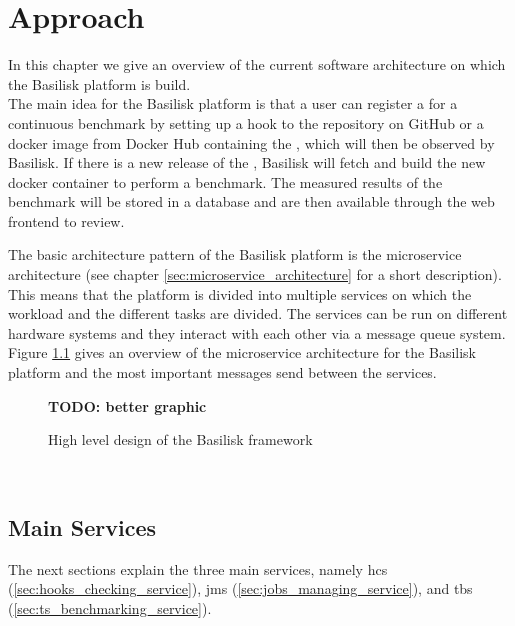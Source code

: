 \chapter{Approach}
\label{ch:approach}

In this chapter we give an overview of the current software architecture on which the Basilisk platform is build.
\\

The main idea for the Basilisk platform is that a user can register a \ts{} for a continuous benchmark by setting up a hook to the repository on GitHub or a docker image from Docker Hub containing the \ts{}, which will then be observed by Basilisk.
If there is a new release of the \ts{}, Basilisk will fetch and build the new docker container to perform a benchmark.
The measured results of the benchmark will be stored in a database and are then available through the web frontend to review.


The basic architecture pattern of the Basilisk platform is the microservice architecture (see chapter \ref{sec:microservice_architecture} for a short description). 
This means that the platform is divided into multiple services on which the workload and the different tasks are divided.
The services can be run on different hardware systems and they interact with each other via a message queue system.
\\

Figure \ref{fig:basilisk_high_level_design} gives an overview of the microservice architecture for the Basilisk platform and the most important messages send between the services.
\begin{figure}[tbph]
	\centering
	\textbf{TODO: better graphic}
	\caption{High level design of the Basilisk framework}
	\label{fig:basilisk_high_level_design}
\end{figure}
\\

\section{Main Services}
\label{sec:main_services}
The next sections explain the three main services, namely \acl{hcs} (\ref{sec:hooks_checking_service}), \acl{jms} (\ref{sec:jobs_managing_service}), and \acl{tbs} (\ref{sec:ts_benchmarking_service}).

